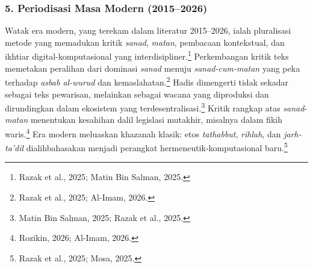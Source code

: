 \subsubsection*{5. Periodisasi Masa Modern (2015--2026)}

Watak era modern, yang terekam dalam literatur 2015--2026, ialah pluralisasi metode yang memadukan kritik \textit{sanad}, \textit{matan}, pembacaan kontekstual, dan ikhtiar digital-komputasional yang interdisipliner.\footnote{Razak et al., 2025; Matin Bin Salman, 2025.} Perkembangan kritik teks memetakan peralihan dari dominasi \textit{sanad} menuju \textit{sanad-cum-matan} yang peka terhadap \textit{asbab al-wurud} dan kemaslahatan.\footnote{Razak et al., 2025; Al-Imam, 2026.} Hadis dimengerti tidak sekadar sebagai teks pewarisan, melainkan sebagai wacana yang diproduksi dan dirundingkan dalam ekosistem yang terdesentralisasi.\footnote{Matin Bin Salman, 2025; Razak et al., 2025.} Kritik rangkap atas \textit{sanad}-\textit{matan} menentukan kesahihan dalil legislasi mutakhir, misalnya dalam fikih waris.\footnote{Rozikin, 2026; Al-Imam, 2026.} Era modern meluaskan khazanah klasik: etos \textit{tathabbut}, \textit{rihlah}, dan \textit{jarh-ta'dil} dialihbahasakan menjadi perangkat hermeneutik-komputasional baru.\footnote{Razak et al., 2025; Mosa, 2025.}

